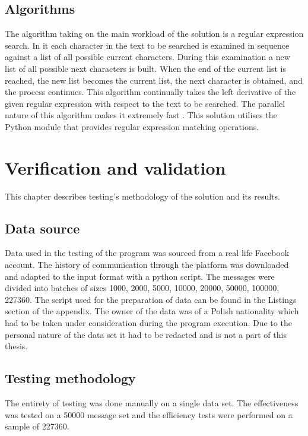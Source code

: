 \documentclass[a4paper,twoside,12pt]{book}
\begin{document}
\section{Algorithms}

The algorithm taking on the main workload of the solution is a regular expression search. In it each character in the text to be searched is examined in sequence against a 
list of all possible current characters. During this examination a new list of all possible next characters is built. When the end of the current list is reached, the new list becomes the current list, the next 
character is obtained, and the process continues. This algorithm continually takes the left derivative of the given regular expression with respect to the text to be searched. The parallel nature of this algorithm 
makes it extremely fast \cite{bib:articleRE}. This solution utilises the Python module that provides regular expression matching operations.

\chapter{Verification and validation}

This chapter describes testing's methodology of the solution and its results.

\section{Data source}

Data used in the testing of the program was sourced from a real life Facebook account. The history of communication through the platform was downloaded and adapted to the input format with a python script.
The messages were divided into batches of sizes 1000, 2000, 5000, 10000, 20000, 50000, 100000, 227360. The script used for the preparation of data can be found in the Listings section of the appendix.
The owner of the data was of a Polish nationality which had to be taken under consideration during the program execution. Due to the personal nature of the data set it had to be 
redacted and is not a part of this thesis.

\section{Testing methodology}

The entirety of testing was done manually on a single data set. The effectiveness was tested on a 50000 message set and
the efficiency tests were performed on a sample of 227360.
\end{document}
